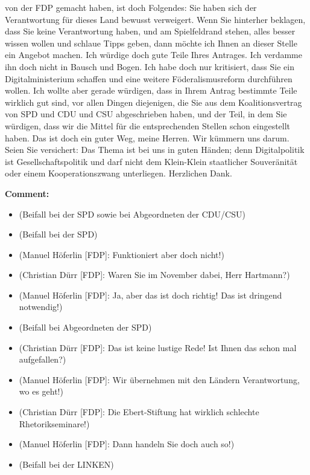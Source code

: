 \documentclass{article}
\begin{document}
von der FDP gemacht haben, ist doch Folgendes: Sie haben sich der Verantwortung für dieses Land bewusst verweigert.  Wenn Sie hinterher beklagen, dass Sie keine Verantwortung haben,  und am Spielfeldrand stehen, alles besser wissen wollen und schlaue Tipps geben, dann möchte ich Ihnen an dieser Stelle ein Angebot machen. Ich würdige doch gute Teile Ihres Antrages. Ich verdamme ihn doch nicht in Bausch und Bogen.  Ich habe doch nur kritisiert, dass Sie ein Digitalministerium schaffen und eine weitere Föderalismusreform durchführen wollen.  Ich wollte aber gerade würdigen, dass in Ihrem Antrag bestimmte Teile wirklich gut sind, vor allen Dingen diejenigen, die Sie aus dem Koalitionsvertrag von SPD und CDU und CSU abgeschrieben haben, und der Teil, in dem Sie würdigen, dass wir die Mittel für die entsprechenden Stellen schon eingestellt haben. Das ist doch ein guter Weg, meine Herren. Wir kümmern uns darum. Seien Sie versichert: Das Thema ist bei uns in guten Händen; denn Digitalpolitik ist Gesellschaftspolitik und darf nicht dem Klein-Klein staatlicher Souveränität oder einem Kooperationszwang unterliegen.  Herzlichen Dank.  

\noindent\textbf{Comment:}
\begin{itemize}
    \setlength\itemsep{-3pt}
    \item (Beifall bei der SPD sowie bei Abgeordneten der CDU/CSU)
    \setlength\itemsep{-3pt}
    \item (Beifall bei der SPD)
    \setlength\itemsep{-3pt}
    \item (Manuel Höferlin [FDP]: Funktioniert aber doch nicht!)
    \setlength\itemsep{-3pt}
    \item (Christian Dürr [FDP]: Waren Sie im November dabei, Herr Hartmann?)
    \setlength\itemsep{-3pt}
    \item (Manuel Höferlin [FDP]: Ja, aber das ist doch richtig! Das ist dringend notwendig!)
    \setlength\itemsep{-3pt}
    \item (Beifall bei Abgeordneten der SPD)
    \setlength\itemsep{-3pt}
    \item (Christian Dürr [FDP]: Das ist keine lustige Rede! Ist Ihnen das schon mal aufgefallen?)
    \setlength\itemsep{-3pt}
    \item (Manuel Höferlin [FDP]: Wir übernehmen mit den Ländern Verantwortung, wo es geht!)
    \setlength\itemsep{-3pt}
    \item (Christian Dürr [FDP]: Die Ebert-Stiftung hat wirklich schlechte Rhetorikseminare!)
    \setlength\itemsep{-3pt}
    \item (Manuel Höferlin [FDP]: Dann handeln Sie doch auch so!)
    \setlength\itemsep{-3pt}
    \item (Beifall bei der LINKEN)
\end{itemize}
\end{document}
